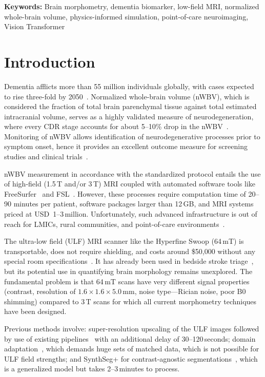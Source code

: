 \documentclass[12pt,a4paper]{article}
\begin{document}
\noindent\textbf{Keywords:}
Brain morphometry, dementia biomarker, low-field MRI, normalized whole-brain
volume, physics-informed simulation, point-of-care neuroimaging,
Vision Transformer

\section{Introduction}
\label{sec:introduction}

Dementia afflicts more than 55 million individuals globally,
with cases expected to rise three-fold by 2050~\cite{who2023}. Normalized
whole-brain volume (nWBV), which is considered the fraction of total brain
parenchymal tissue against total estimated intracranial volume, serves as a
highly validated measure of neurodegeneration, where every CDR stage accounts
for about 5--10\% drop in the nWBV~\cite{fotenos2005,buckner2004}. Monitoring
of nWBV allows identification of neurodegenerative processes prior to symptom
onset, hence it provides an excellent outcome measure for screening studies
and clinical trials~\cite{jack2018nia}.

nWBV measurement in accordance with the standardized protocol entails the use
of high-field (1.5\,T and/or 3\,T) MRI coupled with automated software tools
like FreeSurfer~\cite{fischl2012freesurfer} and FSL~\cite{smith2002fsl}.
However, these processes require computation time of 20--90 minutes per
patient, software packages larger than 12\,GB, and MRI systems priced at
USD~1--3\,million. Unfortunately, such advanced infrastructure is out of reach
for LMICs, rural communities, and point-of-care environments~\cite{prince2016world}.

The ultra-low field (ULF) MRI scanner like the Hyperfine Swoop (64\,mT) is
transportable, does not require shielding, and costs around \$50,000 without
any special room specifications~\cite{hyperfine2021}. It has already been used
in bedside stroke triage~\cite{kimberly2023bedside}, but its potential use in
quantifying brain morphology remains unexplored. The fundamental problem is
that 64\,mT scans have very different signal properties (contrast, resolution
of $1.6\times1.6\times5.0$\,mm, noise type---Rician noise, poor B0 shimming)
compared to 3\,T scans for which all current morphometry techniques have been
designed.

Previous methods involve: super-resolution upscaling of the ULF images
followed by use of existing pipelines~\cite{iglesias2023synthsr} with an
additional delay of 30--120\,seconds; domain
adaptation~\cite{chen2019synergistic}, which demands huge sets of matched
data, which is not possible for ULF field strengths; and SynthSeg+ for
contrast-agnostic segmentations~\cite{billot2023synthseg}, which is a
generalized model but takes 2--3\,minutes to process.
\end{document}
